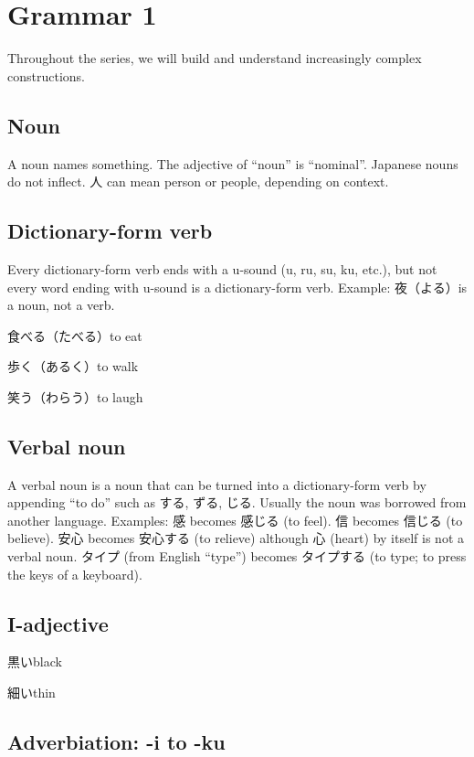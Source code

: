 \chapter{Grammar 1}

Throughout the series, we will build and understand increasingly complex constructions.

\section{Noun}

A noun names something.
The adjective of ``noun'' is ``nominal''.
Japanese nouns do not inflect.
人 can mean person or people, depending on context.

\section{Dictionary-form verb}

Every dictionary-form verb ends with a u-sound (u, ru, su, ku, etc.),
but not every word ending with u-sound is a dictionary-form verb.
Example: 夜（よる）is a noun, not a verb.

食べる（たべる）to eat

歩く（あるく）to walk

笑う（わらう）to laugh

\section{Verbal noun}

A verbal noun is a noun that can be
turned into a dictionary-form verb
by appending ``to do'' such as する, ずる, じる.
Usually the noun was borrowed from another language.
Examples:
感 becomes 感じる (to feel).
信 becomes 信じる (to believe).
安心 becomes 安心する (to relieve) although
心 (heart) by itself is not a verbal noun.
タイプ (from English ``type'') becomes
タイプする (to type; to press the keys of a keyboard).

\section{I-adjective}

黒いblack

細いthin

\section{Adverbiation: -i to -ku}

